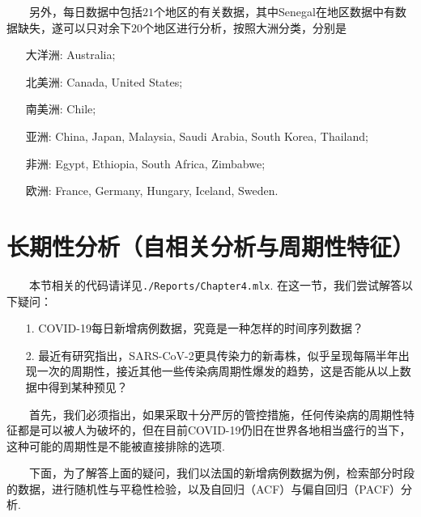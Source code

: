 \documentclass[a4paper, titlepage]{article}
\begin{document}
    　　另外，每日数据中包括$21$个地区的有关数据，其中Senegal在地区数据中有数据缺失，遂可以只对余下$20$个地区进行分析，按照大洲分类，分别是
    \vspace{5pt}
    \begin{adjustwidth}{1cm}{0cm}
    {\kaishu
    \begin{itemize}[itemsep=-1pt,topsep=1pt]
        \item [大洋洲:] Australia;
        \item [北美洲:]Canada, United States;
        \item [南美洲:]Chile;
        \item [亚洲:]China, Japan, Malaysia, Saudi Arabia, South Korea, Thailand;
        \item [非洲:]Egypt, Ethiopia, South Africa, Zimbabwe;
        \item [欧洲:]France, Germany, Hungary, Iceland, Sweden.
    \end{itemize}
    }
    \end{adjustwidth}

    \newpage
    \section{长期性分析（自相关分析与周期性特征）}\label{自相关分析}
        　　本节相关的代码请详见\texttt{./Reports/Chapter4.mlx}. 在这一节，我们尝试解答以下疑问：
        \begin{enumerate}
            \item [1.] COVID-19每日新增病例数据，究竟是一种怎样的时间序列数据？
            \item [2.] 最近有研究指出，SARS-CoV-2更具传染力的新毒株，似乎呈现每隔半年出现一次的周期性，接近其他一些传染病周期性爆发的趋势，这是否能从以上数据中得到某种预见？
        \end{enumerate}
        
        　　首先，我们必须指出，如果采取十分严厉的管控措施，任何传染病的周期性特征都是可以被人为破坏的，但在目前COVID-19仍旧在世界各地相当盛行的当下，这种可能的周期性是不能被直接排除的选项.

        　　下面，为了解答上面的疑问，我们以法国的新增病例数据为例，检索部分时段的数据，进行随机性与平稳性检验，以及自回归（ACF）与偏自回归（PACF）分析. 
\end{document}
